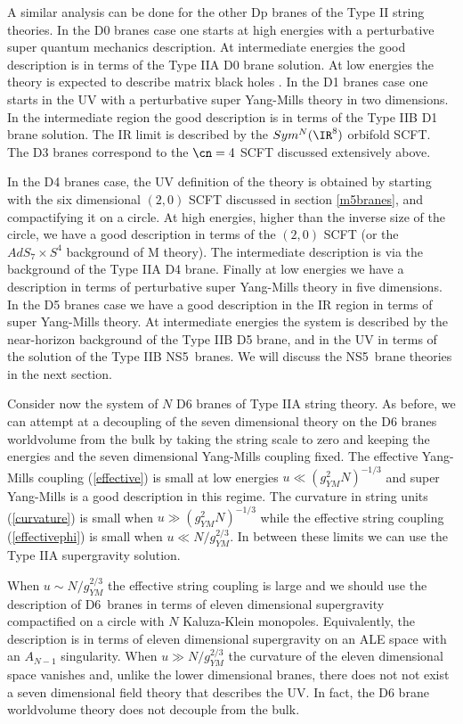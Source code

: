 A similar analysis can be done for the other Dp branes of the Type II
string theories.  In the D0 branes case one starts at high energies
with a perturbative super quantum mechanics description. At
intermediate energies the good description is in terms of the Type IIA
D0 brane solution. At low energies the theory is expected to describe
matrix black holes \cite{Banks:1998hz}. 
 In the D1 branes case one starts in
the UV with a perturbative super Yang-Mills theory in two dimensions.
In the intermediate region the good description is in terms of the
Type IIB D1 brane solution. The IR limit is described by the $Sym^N
(\IR^8)$ orbifold SCFT.  The D3 branes correspond to the $\cn=4$ SCFT
discussed extensively above.

In the D4 branes case, the UV definition of the theory is obtained by
starting with the six dimensional $(2,0)$ SCFT discussed in section
\ref{m5branes}, and compactifying it on a circle. At high energies,
higher than the inverse size of the circle, we have a good description
in terms of the $(2,0)$ SCFT (or the $AdS_7\times S^4$ background of M
theory). The intermediate description is via the background of the
Type IIA D4 brane. Finally at low energies we have a description in
terms of perturbative super Yang-Mills theory in five dimensions.  In
the D5 branes case we have a good description in the IR region in
terms of super Yang-Mills theory. At intermediate energies the system
is described by the near-horizon background of the Type IIB D5 brane,
and in the UV in terms of the solution of the Type IIB NS5~branes.
We will discuss the NS5~brane theories in the next section.

Consider now the system of $N$ D6 branes of Type IIA string theory.
As before, we can attempt at a decoupling of the seven dimensional
theory on the D6 branes worldvolume from the bulk by taking the string
scale to zero and keeping the energies and the seven dimensional
Yang-Mills coupling fixed.  The effective Yang-Mills coupling
(\ref{effective}) is small at low energies $u \ll
(g_{YM}^2N)^{-1/3}$ and super Yang-Mills is a good
description in this regime.  The curvature in string units
(\ref{curvature}) is small when $u \gg (g_{YM}^2N)^{-1/3}$
while the effective string coupling (\ref{effectivephi}) is small when
$u \ll N/g_{YM}^{2/3}$. In between these limits we can use the
Type IIA supergravity solution.

When $u \sim N/g_{YM}^{2/3}$ the effective string coupling is
large and we should use the description of D6~branes in terms of
eleven dimensional supergravity compactified on a circle with $N$
Kaluza-Klein monopoles. Equivalently, the description is in terms of
eleven dimensional supergravity on an ALE space with an $A_{N-1}$
singularity.  When $u \gg N/g_{YM}^{2/3}$ the curvature of the
eleven dimensional space vanishes and, unlike the lower dimensional
branes, there does not not exist a seven dimensional field theory that
describes the UV.  In fact, the D6 brane worldvolume theory does not
decouple from the bulk.

